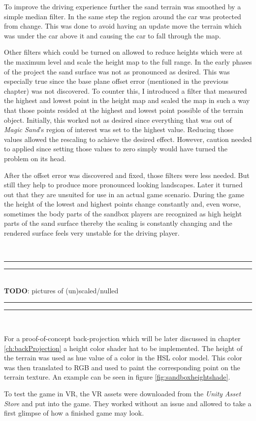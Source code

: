 \documentclass[12pt,a4paper,twoside,titlepage,headsepline,numbers=noenddot,listof=totoc,index=totoc,bibliography=totoc]{scrartcl}
\theoremstyle{break}
\providecommand{\TODO}[1]{{\small ~\\\hrule\vspace{0.1cm}\hrule~\\\textbf{TODO}:  #1~\\\hrule\vspace{0.1cm}\hrule~\\}}
\begin{document}
To improve the driving experience further the sand terrain was smoothed by a simple median filter. In the same step the region around the car was protected from change. This was done to avoid having an update move the terrain which was under the car above it and causing the car to fall through the map.

Other filters which could be turned on allowed to reduce heights which were at the maximum level and scale the height map to the full range. In the early phases of the project the sand surface was not as pronounced as desired. This was especially true since the base plane offset error (mentioned in the previous chapter) was not discovered. To counter this, I introduced a filter that measured the highest and lowest point in the height map and scaled the map in such a way that those points resided at the highest and lowest point possible of the terrain object. Initially, this worked not as desired since everything that was out of \textit{Magic Sand}'s region of interest was set to the highest value. Reducing those values allowed the rescaling to achieve the desired effect. However, caution needed to applied since setting those values to zero simply would have turned the problem on its head. 

After the offset error was discovered and fixed, those filters were less needed. But still they help to produce more pronounced looking landscapes. Later it turned out that they are unsuited for use in an actual game scenario. During the game the height of the lowest and highest points change constantly and, even worse, sometimes the body parts of the sandbox players are recognized as high height parts of the sand surface thereby the scaling is constantly changing and the rendered surface feels very unstable for the driving player.

\TODO{pictures of (un)scaled/nulled}

For a proof-of-concept back-projection which will be later discussed in chapter \ref{ch:backProjection} a height color shader hat to be implemented. The height of the terrain was used as hue value of a color in the HSL color model. This color was then translated to RGB and used to paint the corresponding point on the terrain texture. An example can be seen in figure \ref{fig:sandboxheightshade}.

To test the game in VR, the VR assets were downloaded from the \textit{Unity Asset Store} and put into the game. They worked without an issue and allowed to take a first glimpse of how a finished game may look. 
 
\end{document}
